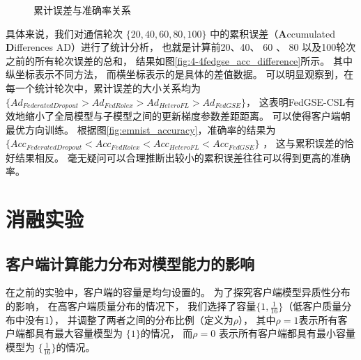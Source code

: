 \begin{figure}[thbp]
    \centering
    \hfill
    \hfill
    \caption{累计误差与准确率关系}
    \label{fig:dis_all1}
\end{figure}


具体来说，我们对通信轮次
$\{ 20, 40, 60, 80, 100 \}$ 
中的累积误差（\textbf{A}ccumulated \textbf{D}ifferences AD）进行了统计分析，
也就是计算前20、40、 60 、 80 以及100轮次之前的所有轮次误差的总和，
结果如图\ref{fig:4-4fedgse_acc_difference}所示。
其中纵坐标表示不同方法，
而横坐标表示的是具体的差值数据。
可以明显观察到，在每一个统计轮次中，累计误差的大小关系均为
$\{ Ad_{Federated Dropout} > Ad_{FedRolex} > Ad_{HeteroFL} > Ad_{FedGSE} \}$， 
这表明FedGSE-CSL有效地缩小了全局模型与子模型之间的更新梯度参数差距距离。
可以使得客户端朝最优方向训练。
根据图\ref{fig:emnist_accuracy}，准确率的结果为
$\{ Acc_{Federated Dropout} < Acc_{FedRolex} < Acc_{HeteroFL} < Acc_{FedGSE} \}$ ，
这与累积误差的恰好结果相反。
毫无疑问可以合理推断出较小的累积误差往往可以得到更高的准确率。

\section{消融实验}
\subsection{客户端计算能力分布对模型能力的影响}
在之前的实验中，客户端的容量是均匀设置的。
为了探究客户端模型异质性分布的影响，
在高客户端质量分布的情况下，
我们选择了容量$\{1, \frac{1}{16} \} $（低客户质量分布中没有1），
并调整了两者之间的分布比例（定义为$\rho$），
其中$\rho=1$表示所有客户端都具有最大容量模型为 $\{1 \} $的情况，
而$\rho=0$ 表示所有客户端都具有最小容量模型为 $\{ \frac{1}{16} \} $的情况。


